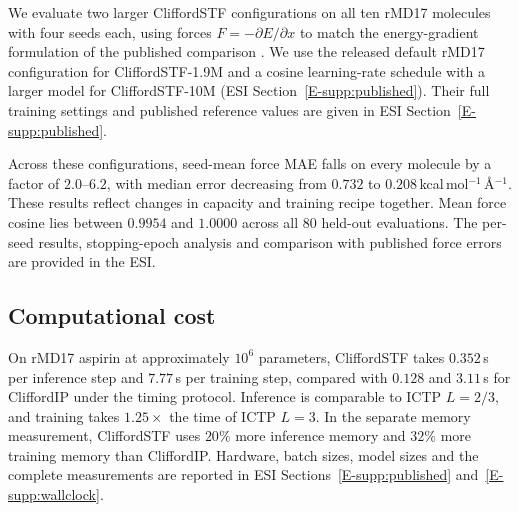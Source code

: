 We evaluate two larger CliffordSTF configurations on all ten rMD17 molecules with four seeds each, using forces $F=-\partial E/\partial x$ to match the energy-gradient formulation of the published comparison \cite{aykent2025gotennet}. We use the released default rMD17 configuration for CliffordSTF-1.9M and a cosine learning-rate schedule with a larger model for CliffordSTF-10M (ESI Section~\ref{E-supp:published}). Their full training settings and published reference values are given in ESI Section~\ref{E-supp:published}.

Across these configurations, seed-mean force MAE falls on every molecule by a factor of $2.0$--$6.2$, with median error decreasing from $0.732$ to $0.208$\,kcal\,mol$^{-1}$\,\AA$^{-1}$. These results reflect changes in capacity and training recipe together. Mean force cosine lies between $0.9954$ and $1.0000$ across all 80 held-out evaluations. The per-seed results, stopping-epoch analysis and comparison with published force errors are provided in the ESI.

\subsection{Computational cost}\label{sec:cost}

On rMD17 aspirin at approximately $10^6$ parameters, CliffordSTF takes $0.352$\,s per inference step and $7.77$\,s per training step, compared with $0.128$ and $3.11$\,s for CliffordIP under the timing protocol. Inference is comparable to ICTP $L{=}2/3$, and training takes $1.25\times$ the time of ICTP $L{=}3$. In the separate memory measurement, CliffordSTF uses $20\%$ more inference memory and $32\%$ more training memory than CliffordIP. Hardware, batch sizes, model sizes and the complete measurements are reported in ESI Sections~\ref{E-supp:published} and~\ref{E-supp:wallclock}.
